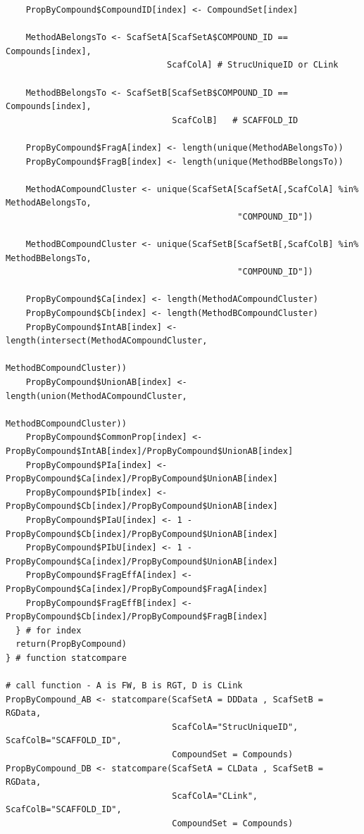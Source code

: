 \documentclass[11pt,letterpaper,biochem]{article}
\begin{document}
{\begin{lstlisting}
    PropByCompound$CompoundID[index] <- CompoundSet[index]
  
    MethodABelongsTo <- ScafSetA[ScafSetA$COMPOUND_ID == Compounds[index],
                                ScafColA] # StrucUniqueID or CLink
    
    MethodBBelongsTo <- ScafSetB[ScafSetB$COMPOUND_ID == Compounds[index],
                                 ScafColB]   # SCAFFOLD_ID
    
    PropByCompound$FragA[index] <- length(unique(MethodABelongsTo))
    PropByCompound$FragB[index] <- length(unique(MethodBBelongsTo))
    
    MethodACompoundCluster <- unique(ScafSetA[ScafSetA[,ScafColA] %in% MethodABelongsTo,
                                              "COMPOUND_ID"])
  
    MethodBCompoundCluster <- unique(ScafSetB[ScafSetB[,ScafColB] %in% MethodBBelongsTo,
                                              "COMPOUND_ID"])
    
    PropByCompound$Ca[index] <- length(MethodACompoundCluster)
    PropByCompound$Cb[index] <- length(MethodBCompoundCluster)
    PropByCompound$IntAB[index] <- length(intersect(MethodACompoundCluster,
                                                    MethodBCompoundCluster))
    PropByCompound$UnionAB[index] <- length(union(MethodACompoundCluster,
                                                  MethodBCompoundCluster))
    PropByCompound$CommonProp[index] <- PropByCompound$IntAB[index]/PropByCompound$UnionAB[index]
    PropByCompound$PIa[index] <- PropByCompound$Ca[index]/PropByCompound$UnionAB[index]
    PropByCompound$PIb[index] <- PropByCompound$Cb[index]/PropByCompound$UnionAB[index]
    PropByCompound$PIaU[index] <- 1 - PropByCompound$Cb[index]/PropByCompound$UnionAB[index]
    PropByCompound$PIbU[index] <- 1 - PropByCompound$Ca[index]/PropByCompound$UnionAB[index]
    PropByCompound$FragEffA[index] <- PropByCompound$Ca[index]/PropByCompound$FragA[index]
    PropByCompound$FragEffB[index] <- PropByCompound$Cb[index]/PropByCompound$FragB[index]
  } # for index
  return(PropByCompound) 
} # function statcompare

# call function - A is FW, B is RGT, D is CLink
PropByCompound_AB <- statcompare(ScafSetA = DDData , ScafSetB = RGData, 
                                 ScafColA="StrucUniqueID", ScafColB="SCAFFOLD_ID", 
                                 CompoundSet = Compounds)
PropByCompound_DB <- statcompare(ScafSetA = CLData , ScafSetB = RGData, 
                                 ScafColA="CLink", ScafColB="SCAFFOLD_ID", 
                                 CompoundSet = Compounds)


\end{lstlisting}}
\end{document}
